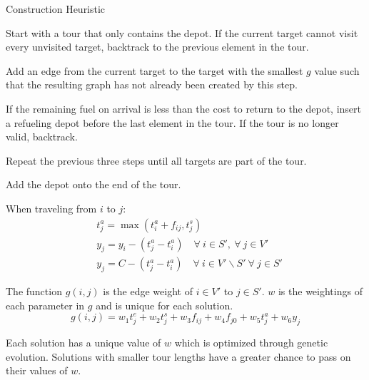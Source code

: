 
\begin{algorithm}
\caption{Construction Heuristic}\label{alg:heuristic}
\begin{algorithmic}[1]

\State Start with a tour that only contains the depot.
\State If the current target cannot visit every unvisited target, backtrack to the previous element in the tour.

\State Add an edge from the current target to the target with the smallest $g$ value such that the resulting graph has not already been created by this step.

\State If the remaining fuel on arrival is less than the cost to return to the depot, insert a refueling depot before the last element in the tour. If the tour is no longer valid, backtrack.

\State Repeat the previous three steps until all targets are part of the tour.

\State Add the depot onto the end of the tour.

\end{algorithmic}
\end{algorithm}

\noindent When traveling from $i$ to $j$:
\begin{align}
    & t^a_j = \max(t^a_i + f_{ij}, t^s_j) \\
    & y_j = y_i - (t^a_j - t^a_i) 
    \quad \forall\ i \in S', \ \forall\ j \in V' \\
    & y_j = C - (t^a_j - t^a_i)
    \quad \forall\ i \in V'\backslash S' \ \forall\ j \in S'
\end{align}

\noindent The function $g(i,j)$ is the edge weight of $i\in V'$ to $j\in S'$. $w$ is the weightings of each parameter in $g$ and is unique for each solution.
%
\begin{equation}
    g(i,j) =
    w_1 t^e_j +
    w_2 t^s_j +
    w_3 f_{ij} +
    w_4 f_{j0} +
    w_5 t^a_j +
    w_6 y_j
\end{equation}

\noindent Each solution has a unique value of $w$ which is optimized through genetic evolution. Solutions with smaller tour lengths have a greater chance to pass on their values of $w$.
